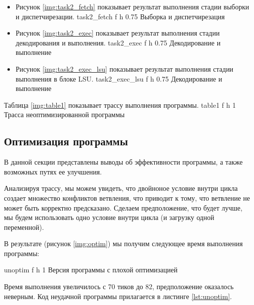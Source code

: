 \begin{itemize}
\item Рисунок \ref{img:task2_fetch} показывает результат выполнения стадии выборки и диспетчирезации.
{task2_fetch} %
{f} %
{h} %
{0.75\textwidth} %
{Выборка и диспетчирезация} %

\item Рисунок \ref{img:task2_exec} показывает результат выполнения стадии декодирования и выполнения.
{task2_exec} %
{f} %
{h} %
{0.75\textwidth} %
{Декодирование и выполнение} %

\item Рисунок \ref{img:task2_exec_lsu} показывает результат выполнения стадии выполнения в блоке LSU.
{task2_exec_lsu} %
{f} %
{h} %
{0.75\textwidth} %
{Декодирование и выполнение} %
\end{itemize}

Таблица \ref{img:table1} показывает трассу выполнения программы.
{table1}
{f}
{h}
{1\textwidth}
{Трасса неоптимизированной программы}
\clearpage

\subsection{Оптимизация программы}

В данной секции представлены выводы об эффективности программы, а также возможных путях ее улучшения.

Анализируя трассу, мы можем увидеть, что двойноное условие внутри цикла создает множество конфликтов ветвления,
что приводит к тому, что ветвление не может быть корректно предсказано.
Сделаем предположение, что будет лучше, мы будем использовать одно условие внутри цикла (и загрузку одной переменной).

В результате (рисунок \ref{img:optim}) мы получим следующее время выполнения программы:

{unoptim}
{f}
{h}
{1\textwidth}
{Версия программы с плохой оптимизацией}
\clearpage

Время выполнения увеличилось с 70 тиков до 82, предположение оказалось неверным. Код неудачной программы прилагается в листинге \ref{lst:unoptim}.

